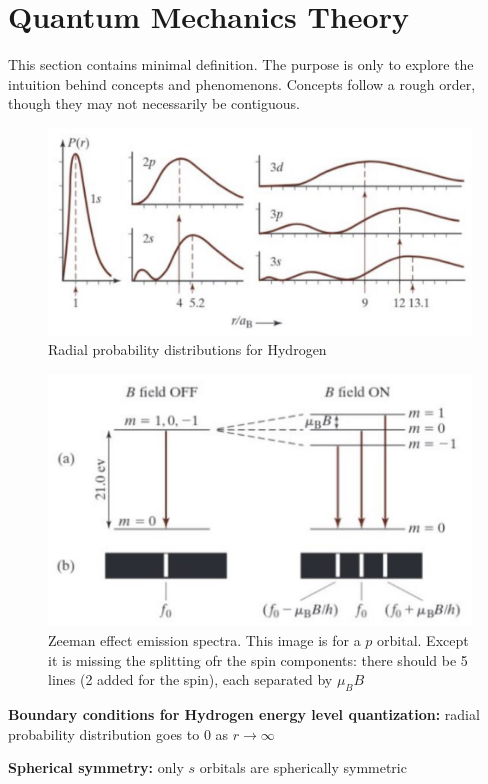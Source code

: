\documentclass[11pt,fleqn]{book}
\begin{document}
\chapter{Quantum Mechanics Theory}
This section contains minimal definition. The purpose is only to explore the intuition behind concepts and phenomenons. Concepts follow a rough order, though they may not necessarily be contiguous.
\begin{figure}[h!]
	\begin{center}
		\includegraphics[width=1\linewidth]{Pictures/radial.png}
	\end{center}
	\caption{Radial probability distributions for Hydrogen
	}
\end{figure}
\begin{figure}[h!]
	\begin{center}
		\includegraphics[width=0.6\linewidth]{Pictures/z.png}
	\end{center}
	\caption{Zeeman effect emission spectra. This image is for a $p$ orbital. Except it is missing the splitting ofr the spin components: there should be 5 lines (2 added for the spin), each separated by $\mu_BB$
	}
\end{figure}

\textbf{Boundary conditions for Hydrogen energy level quantization: }radial probability distribution goes to 0 as $r\rightarrow\infty$

\textbf{Spherical symmetry: }only $s$ orbitals are spherically symmetric
\end{document}
